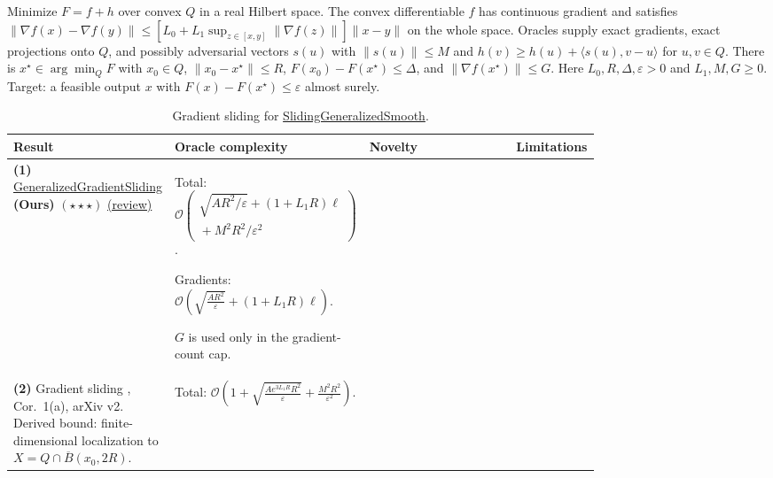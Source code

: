 \begin{table}[tp]
\centering
\caption{Gradient sliding for \href{https://github.com/k3nfalt/longtails/blob/main/LongTails/Setups/SlidingGeneralizedSmooth.lean}{SlidingGeneralizedSmooth}.}\label{tab:SlidingGeneralizedSmooth}
\parbox{\linewidth}{\footnotesize Minimize $F=f+h$ over convex $Q$ in a real Hilbert space. The convex differentiable $f$ has continuous gradient and satisfies $\|\nabla f(x)-\nabla f(y)\|\le [L_0+L_1\sup_{z\in[x,y]}\|\nabla f(z)\|]\|x-y\|$ on the whole space. Oracles supply exact gradients, exact projections onto $Q$, and possibly adversarial vectors $s(u)$ with $\|s(u)\|\le M$ and $h(v)\ge h(u)+\langle s(u),v-u\rangle$ for $u,v\in Q$. There is $x^\star\in\arg\min_Q F$ with $x_0\in Q$, $\|x_0-x^\star\|\le R$, $F(x_0)-F(x^\star)\le\Delta$, and $\|\nabla f(x^\star)\|\le G$. Here $L_0,R,\Delta,\varepsilon>0$ and $L_1,M,G\ge0$. Target: a feasible output $x$ with $F(x)-F(x^\star)\le\varepsilon$ almost surely.}\par\smallskip
\begin{threeparttable}
\footnotesize
\setlength{\tabcolsep}{4pt}\renewcommand{\arraystretch}{1.25}
\begin{tabularx}{\linewidth}{@{}>{\raggedright\arraybackslash}p{0.20\linewidth}>{\raggedright\arraybackslash}p{0.32\linewidth}>{\raggedright\arraybackslash}p{0.25\linewidth}>{\raggedright\arraybackslash}X@{}}
\toprule
\textbf{Result} & \textbf{Oracle complexity} & \textbf{Novelty} & \textbf{Limitations} \\
\midrule
\textbf{(1)} \href{https://github.com/k3nfalt/longtails/blob/main/LongTails/Theorems/GeneralizedGradientSliding.lean}{Generalized\allowbreak{}Gradient\allowbreak{}Sliding} \textbf{(Ours)} $(\star\star\star)$ \href{https://github.com/k3nfalt/longtails/blob/main/scripts/reviews/GeneralizedGradientSliding.md}{(review)}
& Total: $\mathcal{O}\!\left(\begin{gathered}\sqrt{AR^2/\varepsilon}+(1+L_1R)\ell\\{}+M^2R^2/\varepsilon^2\end{gathered}\right)$.
\par Gradients: $\mathcal{O}\!\left(\sqrt{\frac{AR^2}{\varepsilon}}+(1+L_1R)\ell\right)$.\par $G$ is used only in the gradient-count cap.
& & \\
\midrule[1.2pt]
\textbf{(2)} Gradient sliding \citep{sgsLan2016}, Cor.~1(a), arXiv v2. Derived bound: finite-dimensional localization to $X=Q\cap\overline B(x_0,2R)$.
& Total: $\mathcal{O}\!\left(1+\sqrt{\frac{Ae^{3L_1R}R^2}{\varepsilon}}+\frac{M^2R^2}{\varepsilon^2}\right)$.

\end{tabularx}
\end{threeparttable}
\end{table}
